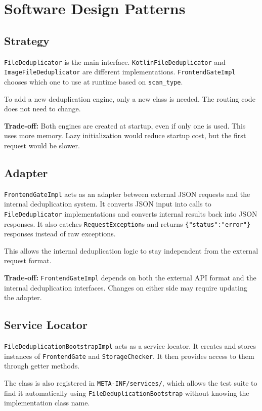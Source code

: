 \section{Software Design Patterns}

\subsection{Strategy}

\texttt{FileDeduplicator} is the main interface.
\texttt{KotlinFileDeduplicator} and \texttt{ImageFileDeduplicator} are different implementations.
\texttt{FrontendGateImpl} chooses which one to use at runtime based on \texttt{scan\_type}.

To add a new deduplication engine, only a new class is needed. The routing code does not need to change.

\textbf{Trade-off:} Both engines are created at startup, even if only one is used. This uses more memory.
Lazy initialization would reduce startup cost, but the first request would be slower.

\subsection{Adapter}

\texttt{FrontendGateImpl} acts as an adapter between external JSON requests and the internal deduplication system.
It converts JSON input into calls to \texttt{FileDeduplicator} implementations and converts internal results back into JSON responses.
It also catches \texttt{RequestException}s and returns \texttt{\{"status":"error"\}} responses instead of raw exceptions.

This allows the internal deduplication logic to stay independent from the external request format.

\textbf{Trade-off:} \texttt{FrontendGateImpl} depends on both the external API format and the internal deduplication interfaces.
Changes on either side may require updating the adapter.

\subsection{Service Locator}

\texttt{FileDeduplicationBootstrapImpl} acts as a service locator.
It creates and stores instances of \texttt{FrontendGate} and \texttt{StorageChecker}. It then provides access to them through getter methods.

The class is also registered in \texttt{META-INF/services/}, which allows the test suite to find it automatically using \texttt{FileDeduplicationBootstrap} without knowing the implementation class name.
